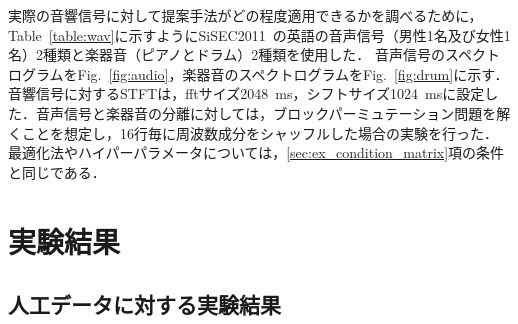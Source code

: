 実際の音響信号に対して提案手法がどの程度適用できるかを調べるために，Table~\ref{table:wav}に示すようにSiSEC2011~\cite{Sisec}の英語の音声信号（男性1名及び女性1名）2種類と楽器音（ピアノとドラム）2種類を使用した．
音声信号のスペクトログラムをFig.~\ref{fig:audio}，楽器音のスペクトログラムをFig.~\ref{fig:drum}に示す．
音響信号に対するSTFTは，fftサイズ2048~ms，シフトサイズ1024~msに設定した．音声信号と楽器音の分離に対しては，ブロックパーミュテーション問題を解くことを想定し，16行毎に周波数成分をシャッフルした場合の実験を行った．
最適化法やハイパーパラメータについては，\ref{sec:ex_condition_matrix}項の条件と同じである．
\section{実験結果}
\label{sec:ex_res}
\subsection{人工データに対する実験結果}
\label{sec:ex_res_artificial}


